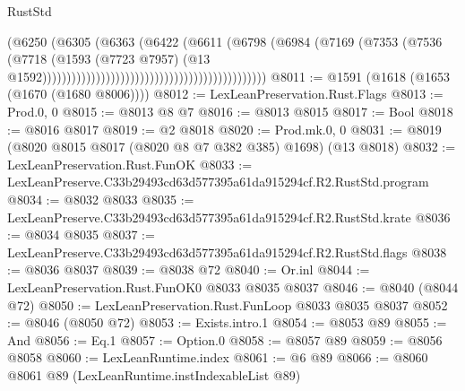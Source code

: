 \begin{lexlean}{RustStd}
\begin{coremodule}
                                                                      (@6250
                                                                        (@6305
                                                                          (@6363
                                                                            (@6422
                                                                              (@6611
                                                                                (@6798
                                                                                  (@6984
                                                                                    (@7169
                                                                                      (@7353
                                                                                        (@7536
                                                                                          (@7718
                                                                                            (@1593
                                                                                              (@7723
                                                                                                @7957)
                                                                                              (@13
                                                                                                @1592))))))))))))))))))))))))))))))))))))))))))))))
@8011 := @1591 (@1618 (@1653 (@1670 (@1680 @8006))))
@8012 := LexLeanPreservation.Rust.Flags
@8013 := Prod.{0, 0}
@8015 := @8013 @8 @7
@8016 := @8013 @8015
@8017 := Bool
@8018 := @8016 @8017
@8019 := @2 @8018
@8020 := Prod.mk.{0, 0}
@8031 := @8019 (@8020 @8015 @8017 (@8020 @8 @7 @382 @385) @1698) (@13 @8018)
@8032 := LexLeanPreservation.Rust.FunOK
@8033 := LexLeanPreserve.C33b29493cd63d577395a61da915294cf.R2.RustStd.program
@8034 := @8032 @8033
@8035 := LexLeanPreserve.C33b29493cd63d577395a61da915294cf.R2.RustStd.krate
@8036 := @8034 @8035
@8037 := LexLeanPreserve.C33b29493cd63d577395a61da915294cf.R2.RustStd.flags
@8038 := @8036 @8037
@8039 := @8038 @72
@8040 := Or.inl
@8044 := LexLeanPreservation.Rust.FunOK0 @8033 @8035 @8037
@8046 := @8040 (@8044 @72)
@8050 := LexLeanPreservation.Rust.FunLoop @8033 @8035 @8037
@8052 := @8046 (@8050 @72)
@8053 := Exists.intro.{1}
@8054 := @8053 @89
@8055 := And
@8056 := Eq.{1}
@8057 := Option.{0}
@8058 := @8057 @89
@8059 := @8056 @8058
@8060 := LexLeanRuntime.index
@8061 := @6 @89
@8066 := @8060 @8061 @89 (LexLeanRuntime.instIndexableList @89)

\end{coremodule}
\end{lexlean}
